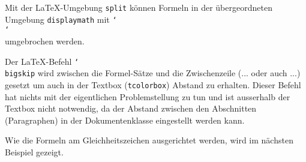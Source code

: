 
Mit der \LaTeX-Umgebung \texttt{split} können Formeln in der übergeordneten Umgebung \texttt{displaymath} mit \texttt{\char`\\}\texttt{\char`\\} umgebrochen werden.

Der \LaTeX-Befehl \texttt{\char`\\bigskip} wird zwischen die Formel-Sätze und die Zwischenzeile (... oder auch ...) gesetzt um auch in der Textbox (\texttt{tcolorbox}) Abstand zu erhalten. Dieser Befehl hat nichts mit der eigentlichen  Problemstellung zu tun und ist ausserhalb der Textbox nicht notwendig, da der Abstand zwischen den Abschnitten (Paragraphen) in der Dokumentenklasse eingestellt werden kann.

Wie die Formeln am Gleichheitszeichen ausgerichtet werden, wird im nächsten Beispiel gezeigt.
